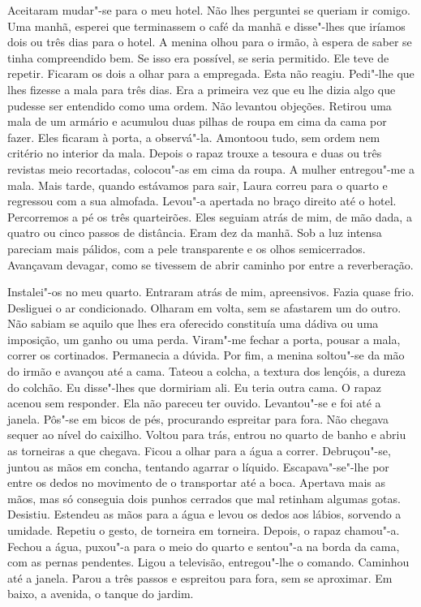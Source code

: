 Aceitaram mudar"-se para o meu hotel. Não lhes perguntei se queriam ir
comigo. Uma manhã, esperei que terminassem o café da manhã e
disse"-lhes que iríamos dois ou três dias para o hotel. A menina olhou
para o irmão, à espera de saber se tinha compreendido bem. Se isso era
possível, se seria permitido. Ele teve de repetir. Ficaram os dois a
olhar para a empregada. Esta não reagiu. Pedi"-lhe que lhes fizesse a
mala para três dias. Era a primeira vez que eu lhe dizia algo que
pudesse ser entendido como uma ordem. Não levantou objeções. Retirou
uma mala de um armário e acumulou duas pilhas de roupa em cima da cama
por fazer. Eles ficaram à porta, a observá"-la. Amontoou tudo, sem ordem
nem critério no interior da mala. Depois o rapaz trouxe a tesoura e duas
ou três revistas meio recortadas, colocou"-as em cima da roupa. A mulher
entregou"-me a mala. Mais tarde, quando estávamos para sair, Laura
correu para o quarto e regressou com a sua almofada. Levou"-a apertada
no braço direito até o hotel. Percorremos a pé os três quarteirões.
Eles seguiam atrás de mim, de mão dada, a quatro ou cinco passos de
distância. Eram dez da manhã. Sob a luz intensa pareciam mais pálidos,
com a pele transparente e os olhos semicerrados. Avançavam devagar, como
se tivessem de abrir caminho por entre a reverberação.

Instalei"-os no meu quarto. Entraram atrás de mim, apreensivos. Fazia
quase frio. Desliguei o ar condicionado. Olharam em volta, sem se
afastarem um do outro. Não sabiam se aquilo que lhes era oferecido
constituía uma dádiva ou uma imposição, um ganho ou uma perda. Viram"-me
fechar a porta, pousar a mala, correr os cortinados. Permanecia a
dúvida. Por fim, a menina soltou"-se da mão do irmão e avançou até a
cama. Tateou a colcha, a textura dos lençóis, a dureza do colchão. Eu
disse"-lhes que dormiriam ali. Eu teria outra cama. O rapaz acenou sem
responder. Ela não pareceu ter ouvido. Levantou"-se e foi até a janela.
Pôs"-se em bicos de pés, procurando espreitar para fora. Não chegava
sequer ao nível do caixilho. Voltou para trás, entrou no quarto de banho
e abriu as torneiras a que chegava. Ficou a olhar para a água a correr.
Debruçou"-se, juntou as mãos em concha, tentando agarrar o líquido.
Escapava"-se"-lhe por entre os dedos no movimento de o transportar até a
boca. Apertava mais as mãos, mas só conseguia dois punhos cerrados que
mal retinham algumas gotas. Desistiu. Estendeu as mãos para a água e
levou os dedos aos lábios, sorvendo a umidade. Repetiu o gesto, de
torneira em torneira. Depois, o rapaz chamou"-a. Fechou a água, puxou"-a
para o meio do quarto e sentou"-a na borda da cama, com as pernas
pendentes. Ligou a televisão, entregou"-lhe o comando. Caminhou até a
janela. Parou a três passos e espreitou para fora, sem se aproximar. Em
baixo, a avenida, o tanque do jardim.

